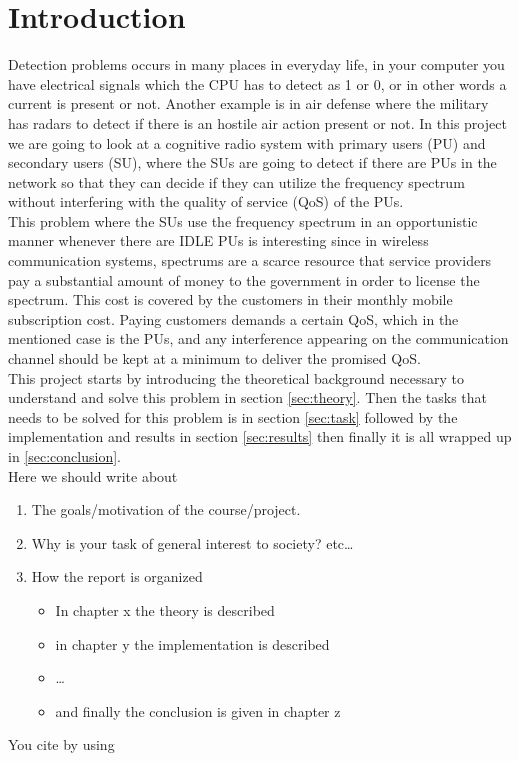\section{Introduction}\label{sec:intro}
Detection problems occurs in many places in everyday life, in your computer you have electrical signals which the CPU has to detect as 1 or 0, or in other words a current is present or not. Another example is in air defense where the military has radars to detect if there is an hostile air action present or not. In this project we are going to look at a cognitive radio system with primary users (PU) and secondary users (SU), where the SUs are going to detect if there are PUs in the network so that they can decide if they can utilize the frequency spectrum without interfering with the quality of service (QoS) of the PUs.\\
This problem where the SUs use the frequency spectrum in an opportunistic manner whenever there are IDLE PUs is interesting since in wireless communication systems, spectrums are a scarce resource that service providers pay a substantial amount of money to the government in order to license the spectrum. This cost is covered by the customers in their monthly mobile subscription cost. Paying customers demands a certain QoS, which in the mentioned case is the PUs, and any interference appearing on the communication channel should be kept at a minimum to deliver the promised QoS.\\
This project starts by introducing the theoretical background necessary to understand and solve this problem in section \ref{sec:theory}. Then the tasks that needs to be solved for this problem is in section \ref{sec:task} followed by the implementation and results in section \ref{sec:results} then finally it is all wrapped up in \ref{sec:conclusion}.\\

Here we should write about
\begin{enumerate}[i]
	\item The goals/motivation of the course/project.
	\item Why is your task of general interest to society? etc\dots
	\item How the report is organized
	\begin{itemize}
		\item In chapter x the theory is described
		\item in chapter y the implementation is described
		\item \dots
		\item and finally the conclusion is given in chapter z
	\end{itemize}
\end{enumerate}

You cite by using \cite{Chen2014}